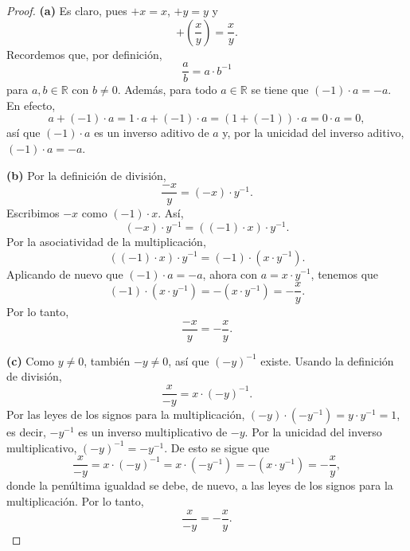 \documentclass[12pt,a4paper]{article}
\begin{document}
    \begin{proof}
        \textbf{(a)} Es claro, pues $+x=x$, $+y=y$ y
        \begin{equation*}
            +\left(\frac{x}{y}\right)=\frac{x}{y}.
        \end{equation*}
        Recordemos que, por definición,
        \begin{equation*}
            \frac{a}{b}=a\cdot b^{-1}
        \end{equation*}
        para $a,b\in\mathbb{R}$ con $b\neq0$. Además, para todo $a\in\mathbb{R}$ se tiene que $(-1)\cdot a=-a$. En efecto,
        \begin{equation*}
            a+(-1)\cdot a=1\cdot a+(-1)\cdot a=(1+(-1))\cdot a=0\cdot a=0,
        \end{equation*}
        así que $(-1)\cdot a$ es un inverso aditivo de $a$ y, por la unicidad del inverso aditivo, $(-1)\cdot a=-a$.

        \textbf{(b)} Por la definición de división,
        \begin{equation*}
            \frac{-x}{y}=(-x)\cdot y^{-1}.
        \end{equation*}
        Escribimos $-x$ como $(-1)\cdot x$. Así,
        \begin{equation*}
            (-x)\cdot y^{-1}=((-1)\cdot x)\cdot y^{-1}.
        \end{equation*}
        Por la asociatividad de la multiplicación,
        \begin{equation*}
            ((-1)\cdot x)\cdot y^{-1}=(-1)\cdot(x\cdot y^{-1}).
        \end{equation*}
        Aplicando de nuevo que $(-1)\cdot a=-a$, ahora con $a=x\cdot y^{-1}$, tenemos que
        \begin{equation*}
            (-1)\cdot(x\cdot y^{-1})=-(x\cdot y^{-1})=-\frac{x}{y}.
        \end{equation*}
        Por lo tanto,
        \begin{equation*}
            \frac{-x}{y}=-\frac{x}{y}.
        \end{equation*}

        \textbf{(c)} Como $y\neq0$, también $-y\neq0$, así que $(-y)^{-1}$ existe. Usando la definición de división,
        \begin{equation*}
            \frac{x}{-y}=x\cdot(-y)^{-1}.
        \end{equation*}
        Por las leyes de los signos para la multiplicación, $(-y)\cdot(-y^{-1})=y\cdot y^{-1}=1$, es decir, $-y^{-1}$ es un inverso multiplicativo de $-y$. Por la unicidad del inverso multiplicativo, $(-y)^{-1}=-y^{-1}$. De esto se sigue que
        \begin{equation*}
            \frac{x}{-y}=x\cdot(-y)^{-1}=x\cdot(-y^{-1})=-(x\cdot y^{-1})=-\frac{x}{y},
        \end{equation*}
        donde la penúltima igualdad se debe, de nuevo, a las leyes de los signos para la multiplicación. Por lo tanto,
        \begin{equation*}
            \frac{x}{-y}=-\frac{x}{y}.
        \end{equation*}


\end{proof}
\end{document}
